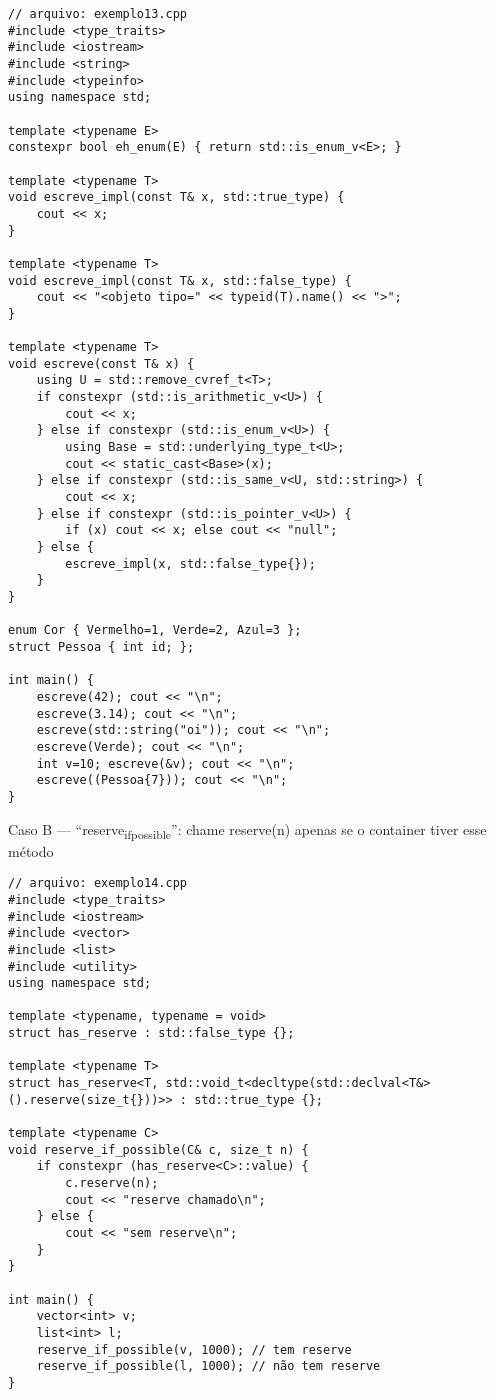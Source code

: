 \documentclass[11pt]{article}
\begin{document}
\begin{verbatim}
// arquivo: exemplo13.cpp
#include <type_traits>
#include <iostream>
#include <string>
#include <typeinfo>
using namespace std;

template <typename E>
constexpr bool eh_enum(E) { return std::is_enum_v<E>; }

template <typename T>
void escreve_impl(const T& x, std::true_type) {
    cout << x;
}

template <typename T>
void escreve_impl(const T& x, std::false_type) {
    cout << "<objeto tipo=" << typeid(T).name() << ">";
}

template <typename T>
void escreve(const T& x) {
    using U = std::remove_cvref_t<T>;
    if constexpr (std::is_arithmetic_v<U>) {
        cout << x;
    } else if constexpr (std::is_enum_v<U>) {
        using Base = std::underlying_type_t<U>;
        cout << static_cast<Base>(x);
    } else if constexpr (std::is_same_v<U, std::string>) {
        cout << x;
    } else if constexpr (std::is_pointer_v<U>) {
        if (x) cout << x; else cout << "null";
    } else {
        escreve_impl(x, std::false_type{});
    }
}

enum Cor { Vermelho=1, Verde=2, Azul=3 };
struct Pessoa { int id; };

int main() {
    escreve(42); cout << "\n";
    escreve(3.14); cout << "\n";
    escreve(std::string("oi")); cout << "\n";
    escreve(Verde); cout << "\n";
    int v=10; escreve(&v); cout << "\n";
    escreve((Pessoa{7})); cout << "\n";
}
\end{verbatim}

Caso B — “reserve\textsubscript{if}\textsubscript{possible}”: chame reserve(n) apenas se o container tiver esse método
\begin{verbatim}
// arquivo: exemplo14.cpp
#include <type_traits>
#include <iostream>
#include <vector>
#include <list>
#include <utility>
using namespace std;

template <typename, typename = void>
struct has_reserve : std::false_type {};

template <typename T>
struct has_reserve<T, std::void_t<decltype(std::declval<T&>().reserve(size_t{}))>> : std::true_type {};

template <typename C>
void reserve_if_possible(C& c, size_t n) {
    if constexpr (has_reserve<C>::value) {
        c.reserve(n);
        cout << "reserve chamado\n";
    } else {
        cout << "sem reserve\n";
    }
}

int main() {
    vector<int> v;
    list<int> l;
    reserve_if_possible(v, 1000); // tem reserve
    reserve_if_possible(l, 1000); // não tem reserve
}
\end{verbatim}
\end{document}
